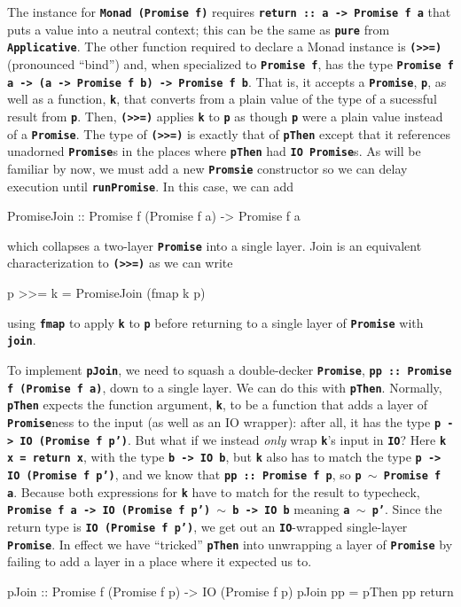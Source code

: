 \documentclass[12pt, english, letterpaper]{kuthesis}
\newcommand{\lit}[1]{\textbf{\texttt{#1}}}
\begin{document}
The instance for \lit{Monad (Promise f)} requires \lit{return ::\ a -> Promise f a} that puts a value into a neutral context; this can be the same as \lit{pure} from \lit{Applicative}.  The other function required to declare a Monad instance is \lit{(>>=)} (pronounced ``bind'') and, when specialized to \lit{Promise f}, has the type \lit{Promise f a -> (a -> Promise f b) -> Promise f b}.  That is, it accepts a \lit{Promise}, \lit p, as well as a function, \lit k, that converts from a plain value of the type of a sucessful result from \lit p.  Then, \lit{(>>=)} applies \lit k to \lit p as though \lit p were a plain value instead of a \lit{Promise}.  The type of \lit{(>>=)} is exactly that of \lit{pThen} except that it references unadorned \lit{Promise}s in the places where \lit{pThen} had \lit{IO Promise}s.  As will be familiar by now, we must add a new \lit{Promsie} constructor so we can delay execution until \lit{runPromise}.  In this case, we can add
  \begin{code}
    PromiseJoin :: Promise f (Promise f a) -> Promise f a
  \end{code}
  which collapses a two-layer \lit{Promise} into a single layer.  Join is an equivalent characterization to \lit{(>>=)} as we can write
  \begin{code}
    p >>= k = PromiseJoin (fmap k p)
  \end{code}
  using \lit{fmap} to apply \lit k to \lit p before returning to a single layer of \lit{Promise} with \lit{join}.
  
  To implement \lit{pJoin}, we need to squash a double-decker \lit{Promise}, \lit{pp ::\ Promise f (Promise f a)}, down to a single layer.  We can do this with \lit{pThen}.  Normally, \lit{pThen} expects the function argument, \lit k, to be a function that adds a layer of \lit{Promise}ness to the input (as well as an IO wrapper): after all, it has the type \lit{p -> IO (Promise f p')}.  But what if we instead \emph{only} wrap \lit k's input in \lit{IO}?  Here \lit{k x = return x}, with the type \lit{b -> IO b}, but \lit k also has to match the type \lit{p -> IO (Promise f p')}, and we know that \lit{pp ::\ Promise f p}, so \lit{p \(\sim\) Promise f a}.  Because both expressions for \lit k have to match for the result to typecheck, \lit{Promise f a -> IO (Promise f p') \(\sim\) b -> IO b} meaning \lit{a \(\sim\) p'}.  Since the return type is \lit{IO (Promise f p')}, we get out an \lit{IO}-wrapped single-layer \lit{Promise}.  In effect we have ``tricked'' \lit{pThen} into unwrapping a layer of \lit{Promise} by failing to add a layer in a place where it expected us to.
  \begin{code}
pJoin :: Promise f (Promise f p) -> IO (Promise f p)
pJoin pp = pThen pp return
  \end{code}
  
\end{document}
